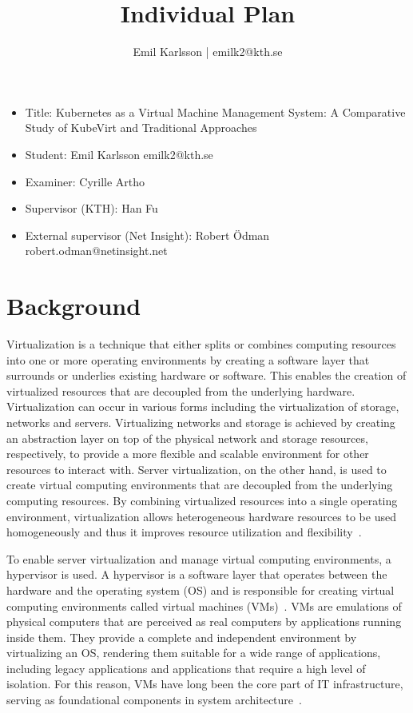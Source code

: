 \documentclass{article}
\title{Individual Plan}
\author{Emil Karlsson | emilk2@kth.se}
\begin{document}
\maketitle

\begin{itemize}
    \item Title: Kubernetes as a Virtual Machine Management System: A Comparative Study of KubeVirt and Traditional Approaches
    \item Student: Emil Karlsson emilk2@kth.se
    \item Examiner: Cyrille Artho
    \item Supervisor (KTH): Han Fu
    \item External supervisor (Net Insight): Robert Ödman robert.odman@netinsight.net
\end{itemize}

\section{Background}
Virtualization is a technique that either splits or combines computing resources into one or more operating environments by creating a software layer that surrounds or underlies existing hardware or software. This enables the creation of virtualized resources that are decoupled from the underlying hardware. Virtualization can occur in various forms including the virtualization of storage, networks and servers. Virtualizing networks and storage is achieved by creating an abstraction layer on top of the physical network and storage resources, respectively, to provide a more flexible and scalable environment for other resources to interact with. Server virtualization, on the other hand, is used to create virtual computing environments that are decoupled from the underlying computing resources. By combining virtualized resources into a single operating environment, virtualization allows heterogeneous hardware resources to be used homogeneously and thus it improves resource utilization and flexibility\ \cite{virtualization-history, virtualization-basics, virtualization-trends}. 

To enable server virtualization and manage virtual computing environments, a hypervisor is used. A hypervisor is a software layer that operates between the hardware and the operating system (OS) and is responsible for creating virtual computing environments called virtual machines (VMs)\ \cite{virtualization-trends, virtualization-ibm, hypervisor-survey}. VMs are emulations of physical computers that are perceived as real computers by applications running inside them. They provide a complete and independent environment by virtualizing an OS, rendering them suitable for a wide range of applications, including legacy applications and applications that require a high level of isolation. For this reason, VMs have long been the core part of IT infrastructure, serving as foundational components in system architecture\ \cite{virtualization-history, virtualization-basics}. 
\end{document}
